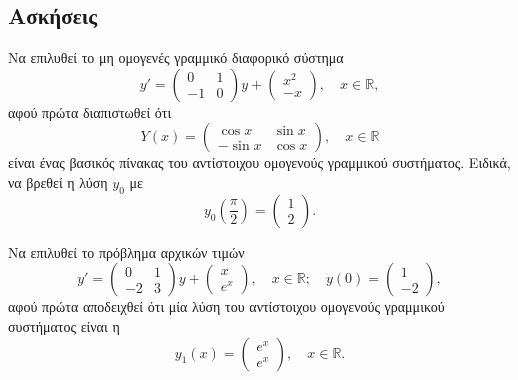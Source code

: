 \documentclass[11pt,a4paper,twoside]{book}
\begin{document}
\subsection{Ασκήσεις}
\begin{askhseis}
\item Να επιλυθεί το μη ομογενές γραμμικό διαφορικό σύστημα
\[
y' = \begin{pmatrix} 0 & 1 \\ -1 & 0 \end{pmatrix} y + \begin{pmatrix} x^2 \\ -x \end{pmatrix}, \quad x \in \mathbb{R},
\]
αφού πρώτα διαπιστωθεί ότι
\[
Y(x) = \begin{pmatrix} \cos x & \sin x \\ -\sin x & \cos x \end{pmatrix}, \quad x \in \mathbb{R}
\]
είναι ένας βασικός πίνακας του αντίστοιχου ομογενούς γραμμικού συστήματος. Ειδικά, να βρεθεί η λύση $y_0$ με
\[
y_0(\frac{\pi}{2}) = \begin{pmatrix} 1 \\ 2 \end{pmatrix}.
\]

\item Να επιλυθεί το πρόβλημα αρχικών τιμών
\[
y' = \begin{pmatrix} 0 & 1 \\ -2 & 3 \end{pmatrix} y + \begin{pmatrix} x \\ e^x \end{pmatrix}, \quad x \in \mathbb{R}; \quad y(0) = \begin{pmatrix} 1 \\ -2 \end{pmatrix},
\]
αφού πρώτα αποδειχθεί ότι μία λύση του αντίστοιχου ομογενούς γραμμικού συστήματος είναι η
\[
y_1(x) = \begin{pmatrix} e^x \\ e^x \end{pmatrix}, \quad x \in \mathbb{R}.
\]


\end{askhseis}
\end{document}
